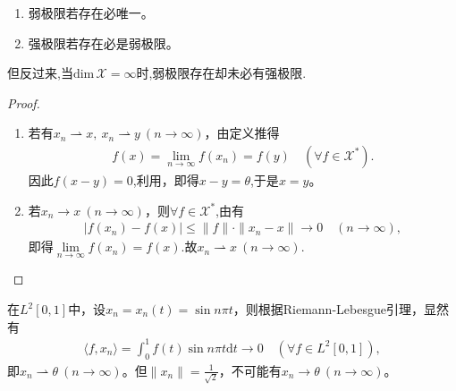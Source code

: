 \documentclass[../../main.tex]{subfiles}%
\begin{document}
\begin{proposition}
\begin{enumerate}[(1)]
\item 弱极限若存在必唯一。
\item 强极限若存在必是弱极限。
\end{enumerate}
\end{proposition}
\begin{remark}
但反过来,当$\text{dim}\,\mathscr{X}=\infty$时,弱极限存在却未必有强极限.
\end{remark}
\begin{proof}
\begin{enumerate}[(1)]
\item 若有$x_n\rightharpoonup x,\ x_n\rightharpoonup y\ (n\to\infty)$，由定义推得
\begin{align*}
f(x)=\lim\limits_{n\to\infty}f(x_n)=f(y)\quad(\forall f\in\mathscr{X}^*).
\end{align*}
因此$f(x-y)=0$,利用，即得$x-y=\theta$,于是$x=y$。

\item 若$x_n\to x\ (n\to\infty)$，则$\forall f\in\mathscr{X}^*$,由有
\begin{align*}
|f(x_n)-f(x)|\leqslant\|f\|\cdot\|x_n-x\|\to0\quad(n\to\infty),
\end{align*}
即得$\lim\limits_{n\to\infty}f(x_n)=f(x)$.故$x_n\rightharpoonup x\ (n\to\infty)$.
\end{enumerate}
\end{proof}

\begin{example}
在$L^2[0,1]$中，设$x_n=x_n(t)=\sin n\pi t$，则根据Riemann-Lebesgue引理，显然有
\begin{align*}
\langle f,x_n\rangle=\int_{0}^{1}f(t)\sin n\pi t\mathrm{d}t\to0\quad(\forall f\in L^2[0,1]),
\end{align*}
即$x_n\rightharpoonup\theta\ (n\to\infty)$。但$\|x_n\|=\frac{1}{\sqrt{2}}$，不可能有$x_n\to\theta\ (n\to\infty)$。
\end{example}
\end{document}
